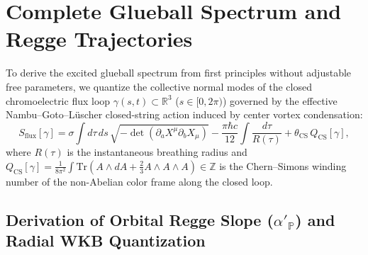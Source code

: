 \documentclass[11pt, a4paper]{article}
\theoremstyle{definition}
\theoremstyle{remark}
\begin{document}
\section{Complete Glueball Spectrum and Regge Trajectories}

To derive the excited glueball spectrum from first principles without adjustable free parameters, we quantize the collective normal modes of the closed chromoelectric flux loop $\gamma(s, t) \subset \mathbb{R}^{3}$ ($s \in [0, 2\pi)$) governed by the effective Nambu--Goto--L\"uscher closed-string action induced by center vortex condensation:
\begin{equation}
  S_{\mathrm{flux}}[\gamma] = \sigma \int d\tau\,ds\,\sqrt{-\det(\partial_{a}X^{\mu}\partial_{b}X_{\mu})} - \frac{\pi\hbar c}{12}\int \frac{d\tau}{R(\tau)} + \theta_{\mathrm{CS}}\,Q_{\mathrm{CS}}[\gamma],
\end{equation}
where $R(\tau)$ is the instantaneous breathing radius and $Q_{\mathrm{CS}}[\gamma] = \frac{1}{8\pi^{2}}\int \mathrm{Tr}(A \wedge dA + \frac{2}{3}A \wedge A \wedge A) \in \mathbb{Z}$ is the Chern--Simons winding number of the non-Abelian color frame along the closed loop.

\subsection{Derivation of Orbital Regge Slope ($\alpha'_{\mathbb{P}}$) and Radial WKB Quantization}
\end{document}
